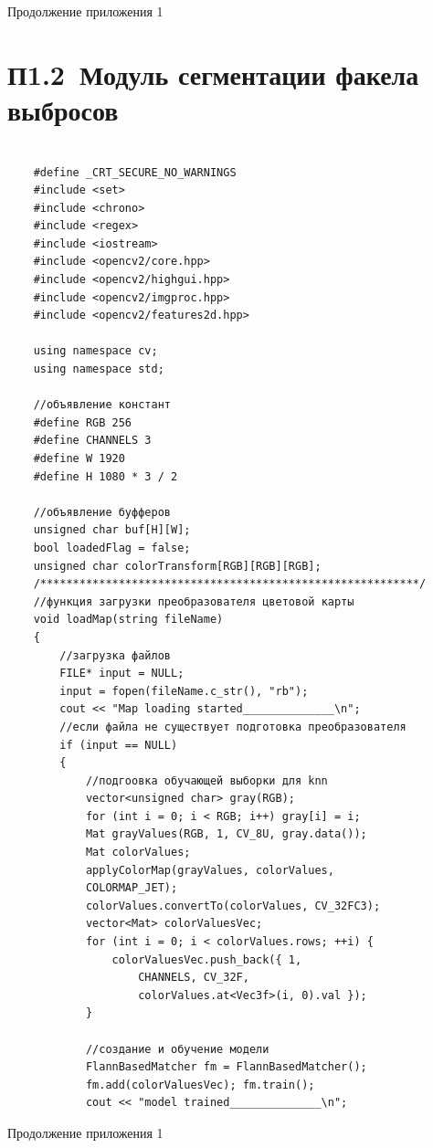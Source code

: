 \documentclass[14pt, a4paper]{extreport}
\begin{document}
\begin{flushright} \noindent Продолжение приложения 1 \end{flushright}
\section*{П1.2~Модуль сегментации факела выбросов}

\begin{Verbatim}[fontseries=c, fontsize=\fontsize{10pt}{12pt}\selectfont]
	
	#define _CRT_SECURE_NO_WARNINGS
	#include <set>
	#include <chrono>
	#include <regex>
	#include <iostream>
	#include <opencv2/core.hpp>
	#include <opencv2/highgui.hpp>
	#include <opencv2/imgproc.hpp>
	#include <opencv2/features2d.hpp>
	
	using namespace cv;
	using namespace std;
	
	//объявление констант
	#define RGB 256
	#define CHANNELS 3
	#define W 1920
	#define H 1080 * 3 / 2
	
	//объявление буфферов
	unsigned char buf[H][W];
	bool loadedFlag = false;
	unsigned char colorTransform[RGB][RGB][RGB];
	/**********************************************************/
	//функция загрузки преобразователя цветовой карты
	void loadMap(string fileName)
	{
		//загрузка файлов
		FILE* input = NULL;
		input = fopen(fileName.c_str(), "rb");
		cout << "Map loading started______________\n";
		//если файла не существует подготовка преобразователя
		if (input == NULL)
		{
			//подгоовка обучающей выборки для knn
			vector<unsigned char> gray(RGB);
			for (int i = 0; i < RGB; i++) gray[i] = i;
			Mat grayValues(RGB, 1, CV_8U, gray.data());
			Mat colorValues;
			applyColorMap(grayValues, colorValues, 
			COLORMAP_JET);
			colorValues.convertTo(colorValues, CV_32FC3);
			vector<Mat> colorValuesVec;
			for (int i = 0; i < colorValues.rows; ++i) {
				colorValuesVec.push_back({ 1, 
					CHANNELS, CV_32F,
					colorValues.at<Vec3f>(i, 0).val });
			}
			
			//создание и обучение модели
			FlannBasedMatcher fm = FlannBasedMatcher();
			fm.add(colorValuesVec); fm.train();
			cout << "model trained______________\n";
\end{Verbatim}
\begin{flushright} \noindent Продолжение приложения 1 \end{flushright}
\end{document}
